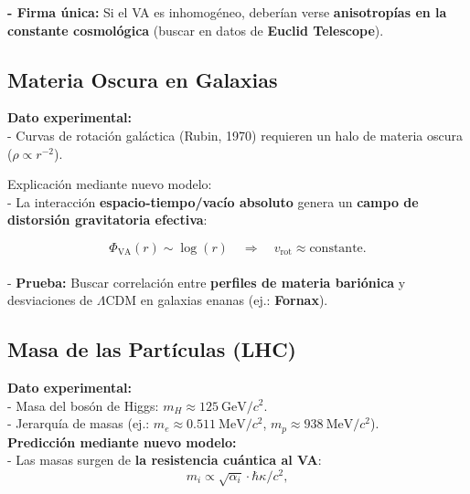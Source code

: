 \documentclass[a4paper]{article}
\theoremstyle{definition}
\theoremstyle{remark}
\numberwithin{equation}{section}
\begin{document}
	\textbf{- Firma única:} Si el VA es inhomogéneo, deberían verse \textbf{anisotropías en la constante cosmológica} (buscar en datos de \textbf{Euclid Telescope}).
	
	
	\subsection{Materia Oscura en Galaxias}
	
	\textbf{Dato experimental:}\\
	
	- Curvas de rotación galáctica (Rubin, 1970) requieren un halo de materia oscura (\( \rho \propto r^{-2} \)).
	
	Explicación mediante nuevo modelo:\\
	
	- La interacción \textbf{espacio-tiempo/vacío absoluto} genera un \textbf{campo de distorsión gravitatoria efectiva}:
	
	\begin{equation}
		\Phi_{\text{VA}}(r) \sim \log(r) \quad \Rightarrow \quad v_{\text{rot}} \approx \text{constante}.
	\end{equation}\\
	
	- \textbf{Prueba:} Buscar correlación entre \textbf{perfiles de materia bariónica} y desviaciones de \( \Lambda \)CDM en galaxias enanas (ej.: \textbf{Fornax}).
	
	\subsection{Masa de las Partículas (LHC)}
	
	\textbf{Dato experimental:}\\
	
	- Masa del bosón de Higgs: \( m_H \approx 125 \ \text{GeV}/c^2 \).\\
	
	- Jerarquía de masas (ej.: \( m_e \approx 0.511 \ \text{MeV}/c^2 \), \( m_p \approx 938 \ \text{MeV}/c^2 \)).\\
	
	\textbf{Predicción mediante nuevo modelo:}\\
	
	
	- Las masas surgen de \textbf{la resistencia cuántica al VA}:\\
	
	\[
	m_i \propto \sqrt{\alpha_i} \cdot \hbar \kappa / c^2,
	\]\\
	
\end{document}

